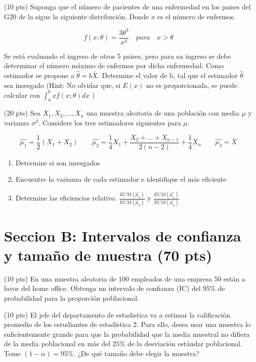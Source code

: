 \documentclass[addpoints]{exam}
\theoremstyle{mytheor}
\begin{document}
  \begin{questions} 
  \question (10 pts) Suponga que el número de pacientes de una enfermedad  en los paises del G20 de la sigue la siguiente distribución. Donde $x$ es el número de enfermos. 
  
  \begin{equation}
  f(x; \theta) = \frac{3 \theta^{3}}{x^{4}} \quad para \quad x > \theta
  \end{equation}
  
  Se está evaluando el ingreso de otros 5 paises, pero para su ingreso se debe determinar el número máximo de enfermos por dicha enfermedad. Como estimador se propone a $\hat{\theta} = b \bar{X}$. Determine el valor de b, tal que el estimador $\hat{\theta}$ sea insesgado (Hint: No olvidar que, si $E(x)$ no es proporcionada, se puede calcular con $\int_{a}^{b} x f(x; \theta) dx$ )
  
  \question (20 pts) Sea $X_1, X_2, ..., X_n$ una muestra aleatoria de una población con media $\mu$ y varianza $\sigma^2$. Considere los tres estimadores siguientes para $\mu$:
  
  \begin{equation}
  \hat{\mu_1} = \frac{1}{2}(X_1+X_2) \quad\quad \hat{\mu_2} = \frac{1}{4}X_1 + \frac{X_2+...+X_{n-1}}{2(n-2)} + \frac{1}{4}X_n \quad\quad \hat{\mu_3} = \bar{X}
  \end{equation}
  
  \begin{enumerate}
  \item Determine si son insesgados
  \item Encuentre la varianza de cada estimador e identifique el más eficiente
  \item Determine las eficiencias relativa: $\frac{ECM(\hat{\mu_2})}{ECM(\hat{\mu_3})}$ y $\frac{ECM(\hat{\mu_1})}{ECM(\hat{\mu_3})}$
  \end{enumerate}

\newpage

\section*{Seccion B: Intervalos de confianza y tamaño de muestra (70 pts)}

\question (10 pts) En una muestra aleatoria de 100 empleados de una empresa 50 están a favor del home office. Obtenga un intervalo de confianza (IC) del $95\%$ de probabilidad para la proporción poblacional.

\question (10 pts) El jefe del departamento de estadistica va a estimar la calificación promedio de los estudiantes de estadística 2. Para ello, desea usar una muestra lo suficientemente grande para que la probabilidad que la media muestral no difiera de la media poblacional en más del $25\%$ de la desviación estándar poblacional. Tome $(1-\alpha)= 95\%$. ¿De qué tamaño debe elegir la muestra? 
  

\end{questions}
\end{document}
